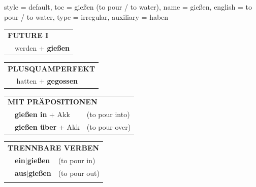 \begin{verbentry}{
  style = {default},
  toc = {gießen (to pour / to water)},
  name = {gießen},
  english = {to pour / to water},
  type = {irregular},
  auxiliary = {haben}
}
\begin{tabular}{rl}
    \multicolumn{2}{l}{\textbf{FUTURE I} }\\
   & werden + \textbf{gießen}\\
 
  \end{tabular}
\hfill
   \begin{tabular}{rl}
      \multicolumn{2}{l}{\textbf{PLUSQUAMPERFEKT}}\\
   & hatten + \textbf{gegossen}\\
  \end{tabular}

   \vspace{10pt}

   \begin{tabular}{lll}
      \multicolumn{3}{l}{\textbf{MIT PRÄPOSITIONEN}}\\
& \textbf{gießen in} + Akk & (to pour into)\\
& \textbf{gießen über} + Akk & (to pour over)\\
\end{tabular}
  \hfill
   \begin{tabular}{lll}
      \multicolumn{3}{l}{\textbf{TRENNBARE VERBEN}}\\
 & \textbf{ein$|$gießen} & (to pour in)\\
 & \textbf{aus$|$gießen} & (to pour out)\\
\vspace{10pt}
  \end{tabular}


  \vspace{-5pt}
\end{verbentry}

